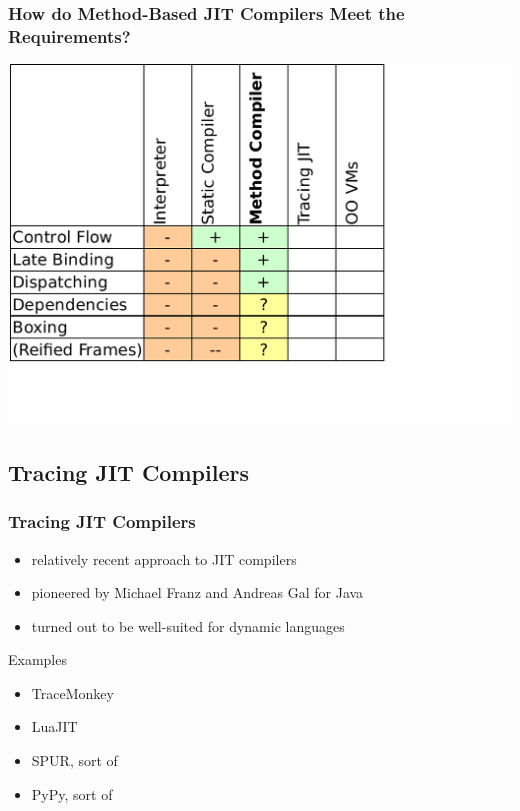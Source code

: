 \documentclass[utf8x]{beamer}
\begin{document}
\begin{frame}
  \frametitle{How do Method-Based JIT Compilers Meet the Requirements?}
  \includegraphics[scale=0.6]{figures/output3.pdf}
\end{frame}



\subsection{Tracing JIT Compilers}

\begin{frame}
  \frametitle{Tracing JIT Compilers}
  \begin{itemize}
      \item relatively recent approach to JIT compilers
      \item pioneered by Michael Franz and Andreas Gal for Java
      \item turned out to be well-suited for dynamic languages
  \end{itemize}
  \pause
  \begin{block}{Examples}
      \begin{itemize}
          \item \alert{TraceMonkey}
          \item \alert{LuaJIT}
          \item \alert{SPUR}, sort of
          \item \alert{PyPy}, sort of
      \end{itemize}
  \end{block}
\end{frame}
\end{document}
